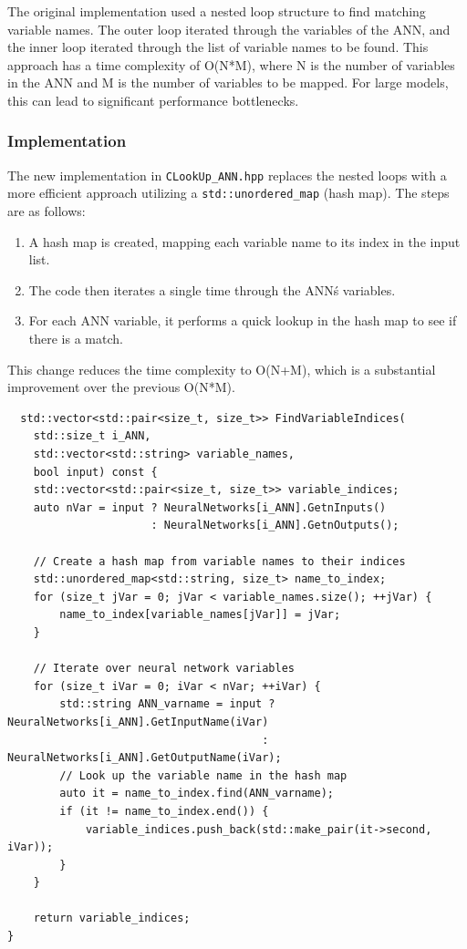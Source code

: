 \documentclass{article}
\begin{document}
The original implementation used a nested loop structure to find matching variable names. The outer loop iterated through the variables of the ANN, and the inner loop iterated through the list of variable names to be found. This approach has a time complexity of O(N*M), where N is the number of variables in the ANN and M is the number of variables to be mapped. For large models, this can lead to significant performance bottlenecks.

\subsubsection{Implementation}
The new implementation in \texttt{CLookUp\_ANN.hpp} replaces the nested loops with a more efficient approach utilizing a \texttt{std::unordered\_map} (hash map). The steps are as follows:

\begin{enumerate}
    \item A hash map is created, mapping each variable name to its index in the input list.
    \item The code then iterates a single time through the ANN\'s variables.
    \item For each ANN variable, it performs a quick lookup in the hash map to see if there is a match.
\end{enumerate}

This change reduces the time complexity to O(N+M), which is a substantial improvement over the previous O(N*M).

\begin{verbatim}
  std::vector<std::pair<size_t, size_t>> FindVariableIndices(
    std::size_t i_ANN,
    std::vector<std::string> variable_names,
    bool input) const {
    std::vector<std::pair<size_t, size_t>> variable_indices;
    auto nVar = input ? NeuralNetworks[i_ANN].GetnInputs()
                      : NeuralNetworks[i_ANN].GetnOutputs();

    // Create a hash map from variable names to their indices
    std::unordered_map<std::string, size_t> name_to_index;
    for (size_t jVar = 0; jVar < variable_names.size(); ++jVar) {
        name_to_index[variable_names[jVar]] = jVar;
    }

    // Iterate over neural network variables
    for (size_t iVar = 0; iVar < nVar; ++iVar) {
        std::string ANN_varname = input ? NeuralNetworks[i_ANN].GetInputName(iVar)
                                       : NeuralNetworks[i_ANN].GetOutputName(iVar);
        // Look up the variable name in the hash map
        auto it = name_to_index.find(ANN_varname);
        if (it != name_to_index.end()) {
            variable_indices.push_back(std::make_pair(it->second, iVar));
        }
    }

    return variable_indices;
}
\end{verbatim}
\end{document}
